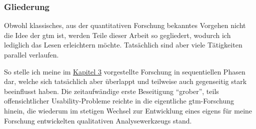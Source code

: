 \subsubsection{Gliederung}

Obwohl klassisches, aus der quantitativen Forschung bekanntes Vorgehen nicht die Idee der \gls{gtm} ist, werden Teile dieser Arbeit so gegliedert, wodurch ich lediglich das Lesen erleichtern möchte. Tatsächlich sind aber viele Tätigkeiten parallel verlaufen.

So stelle ich meine im \hyperref[sec:forschung]{Kapitel 3} vorgestellte Forschung in sequentiellen Phasen dar, welche sich tatsächlich aber überlappt und teilweise auch gegenseitig stark beeinflusst haben. Die zeitaufwändige erste Beseitigung ``grober'', teils offensichtlicher Usability-Probleme reichte in die eigentliche \gls{gtm}-Forschung hinein, die wiederum im stetigen Wechsel zur Entwicklung eines eigens für meine Forschung entwickelten qualitativen Analysewerkzeugs stand.

